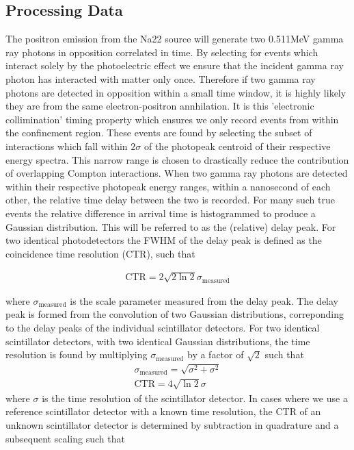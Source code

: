 \subsection{Processing Data}
The positron emission from the Na22 source will generate two 0.511MeV gamma ray photons in opposition correlated in time. By selecting for events which interact solely by the photoelectric effect we ensure that the incident gamma ray photon has interacted with matter only once. Therefore if two gamma ray photons are detected in opposition within a small time window, it is highly likely they are from the same electron-positron annhilation. It is this 'electronic collimination' timing property which ensures we only record events from within the confinement region. These events are found by selecting the subset of interactions which fall within $2\sigma$ of the photopeak centroid of their respective energy spectra. This narrow range is chosen to drastically reduce the contribution of overlapping Compton interactions. When two gamma ray photons are detected within their respective photopeak energy ranges, within a nanosecond of each other, the relative time delay between the two is recorded. For many such true events the relative difference in  arrival time is histogrammed to produce a Gaussian distribution. This will be referred to as the (relative) delay peak. For two identical photodetectors the FWHM of the delay peak is defined as the coincidence time resolution (CTR), such that

\begin{align}
\text{CTR} = 2\sqrt{2\ln{2}}\sigma_\textrm{measured}
\label{eqn:ctrtoscale}
\end{align}

where $\sigma_\textrm{measured}$ is the scale parameter measured from the delay peak. The delay peak is formed from the convolution of two Gaussian distributions, correponding to the delay peaks of the individual scintillator detectors. For two identical scintillator detectors, with two identical Gaussian distributions, the time resolution is found by multiplying $\sigma_\textrm{measured}$ by a factor of $\sqrt{2}$ such that
\begin{align}
\sigma_\textrm{measured} = \sqrt{\sigma^2+\sigma^2}\\
\text{CTR} = 4\sqrt{\ln{2}}\sigma
\label{eqn:trtoctr}
\end{align}
where $\sigma$ is the time resolution of the scintillator detector. In cases where we use a reference scintillator detector with a known time resolution, the CTR of an unknown scintillator detector is determined by subtraction in quadrature and a subsequent scaling such that

